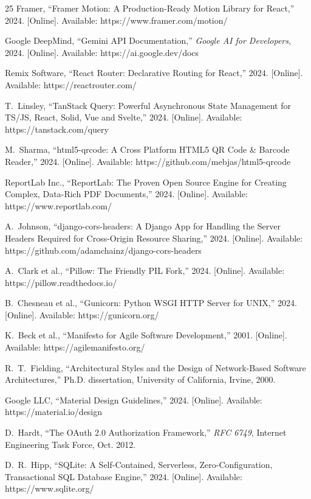 \begin{thebibliography}{25}
Framer, ``Framer Motion: A Production-Ready Motion Library for React,'' 2024. [Online]. Available: https://www.framer.com/motion/

Google DeepMind, ``Gemini API Documentation,'' \textit{Google AI for Developers}, 2024. [Online]. Available: https://ai.google.dev/docs

Remix Software, ``React Router: Declarative Routing for React,'' 2024. [Online]. Available: https://reactrouter.com/

T.~Linsley, ``TanStack Query: Powerful Asynchronous State Management for TS/JS, React, Solid, Vue and Svelte,'' 2024. [Online]. Available: https://tanstack.com/query

M.~Sharma, ``html5-qrcode: A Cross Platform HTML5 QR Code \& Barcode Reader,'' 2024. [Online]. Available: https://github.com/mebjas/html5-qrcode

ReportLab Inc., ``ReportLab: The Proven Open Source Engine for Creating Complex, Data-Rich PDF Documents,'' 2024. [Online]. Available: https://www.reportlab.com/

A.~Johnson, ``django-cors-headers: A Django App for Handling the Server Headers Required for Cross-Origin Resource Sharing,'' 2024. [Online]. Available: https://github.com/adamchainz/django-cors-headers

A.~Clark et al., ``Pillow: The Friendly PIL Fork,'' 2024. [Online]. Available: https://pillow.readthedocs.io/

B.~Chesneau et al., ``Gunicorn: Python WSGI HTTP Server for UNIX,'' 2024. [Online]. Available: https://gunicorn.org/

K.~Beck et al., ``Manifesto for Agile Software Development,'' 2001. [Online]. Available: https://agilemanifesto.org/

R.~T.~Fielding, ``Architectural Styles and the Design of Network-Based Software Architectures,'' Ph.D. dissertation, University of California, Irvine, 2000.

Google LLC, ``Material Design Guidelines,'' 2024. [Online]. Available: https://material.io/design

D.~Hardt, ``The OAuth 2.0 Authorization Framework,'' \textit{RFC 6749}, Internet Engineering Task Force, Oct. 2012.

D.~R.~Hipp, ``SQLite: A Self-Contained, Serverless, Zero-Configuration, Transactional SQL Database Engine,'' 2024. [Online]. Available: https://www.sqlite.org/

\end{thebibliography}
